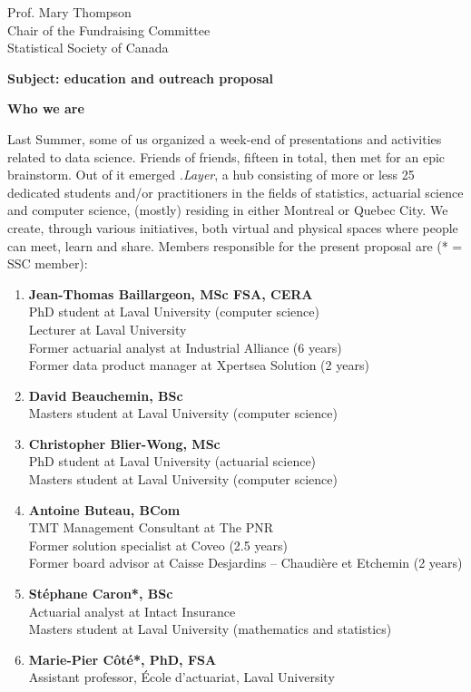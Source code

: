 \documentclass[11pt, a4paper]{letter} %
\begin{document}
\begin{letter}{
	Prof. Mary Thompson\\
	Chair of the Fundraising Committee\\
	Statistical Society of Canada
	
	\bigskip
	\textbf{Subject: education and outreach proposal}%
}
\bigskip
\noindent \textbf{Who we are}

Last Summer, some of us organized a week-end of presentations and activities related to data science. Friends of friends, fifteen in total, then met for an epic brainstorm. Out of it emerged \emph{.Layer}, a hub consisting of more or less 25 dedicated students and/or practitioners in the fields of statistics, actuarial science and computer science, (mostly) residing in either Montreal or Quebec City. We create, through various initiatives, both virtual and physical spaces where people can meet, learn and share. Members responsible for the present proposal are (* = SSC member):
\begin{enumerate}
	\item[] \textbf{Jean-Thomas Baillargeon, MSc FSA, CERA}\\
	\quad PhD student at Laval University (computer science)\\
	\quad Lecturer at Laval University\\
	\quad Former actuarial analyst at Industrial Alliance (6 years)\\
	\quad Former data product manager at Xpertsea Solution (2 years)
	\item[] \textbf{David Beauchemin, BSc}\\
	\quad Masters student at Laval University (computer science)
	\item[] \textbf{Christopher Blier-Wong, MSc}\\
	\quad PhD student at Laval University (actuarial science)\\
	\quad Masters student at Laval University (computer science)
	\item[] \textbf{Antoine Buteau, BCom}\\
	\quad TMT Management Consultant at The PNR\\
	\quad Former solution specialist at Coveo (2.5 years)\\
	\quad Former board advisor at Caisse Desjardins -- Chaudière et Etchemin (2 years)
	\item[] \textbf{Stéphane Caron*, BSc}\\
	\quad Actuarial analyst at Intact Insurance\\
	\quad Masters student at Laval University (mathematics and statistics)
	\item[] \textbf{Marie-Pier Côté*, PhD, FSA}\\
	\quad Assistant professor, École d'actuariat, Laval University\\

\end{enumerate}
\end{letter}
\end{document}
